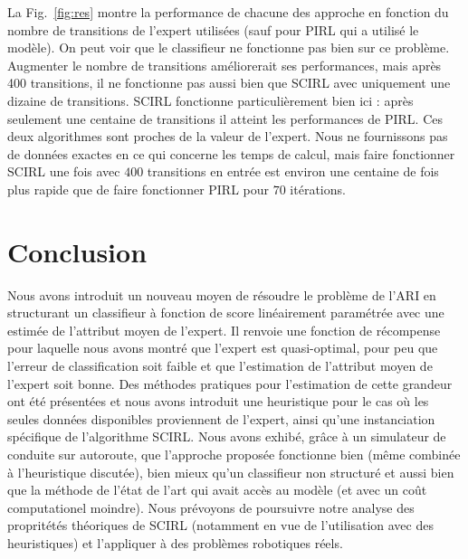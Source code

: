 \documentclass[english,utf8]{./hermes-journal}
\begin{document}
La Fig.~\ref{fig:res} montre la performance de chacune des approche en fonction du nombre de transitions de l'expert utilisées (sauf pour PIRL qui a utilisé le modèle). On peut voir que le classifieur ne fonctionne pas bien sur ce problème. Augmenter le nombre de transitions améliorerait ses performances, mais après 400 transitions, il ne fonctionne pas aussi bien que SCIRL avec uniquement une dizaine de transitions. SCIRL fonctionne particulièrement bien ici : après seulement une centaine de transitions il atteint les performances de PIRL. Ces deux algorithmes sont proches de la valeur de l'expert. Nous ne fournissons pas de données exactes en ce qui concerne les temps de calcul, mais faire fonctionner SCIRL une fois avec $400$ transitions en entrée est environ une centaine de fois plus rapide que de faire fonctionner PIRL pour $70$ itérations.
%



\section{Conclusion}
\label{sec:conclusion}

Nous avons introduit un nouveau moyen de résoudre le problème de l'ARI en structurant un classifieur à fonction de score linéairement paramétrée avec une estimée de l'attribut moyen de l'expert. Il renvoie une fonction de récompense pour laquelle nous avons montré que l'expert est quasi-optimal, pour peu que l'erreur de classification soit faible et que l'estimation de l'attribut moyen de l'expert soit bonne. Des méthodes pratiques pour l'estimation de cette grandeur ont été présentées et nous avons introduit une heuristique pour le cas où les seules données disponibles proviennent de l'expert, ainsi qu'une instanciation spécifique de l'algorithme SCIRL. Nous avons exhibé, grâce à un simulateur de conduite sur autoroute, que l'approche proposée fonctionne bien (même combinée à l'heuristique discutée), bien mieux qu'un classifieur non structuré et aussi bien que la méthode de l'état de l'art qui avait accès au modèle (et avec un coût computationel moindre). Nous prévoyons de poursuivre notre analyse des propritétés théoriques de SCIRL (notamment en vue de l'utilisation avec des heuristiques) et l'appliquer à des problèmes robotiques réels.


\newpage

\end{document}
